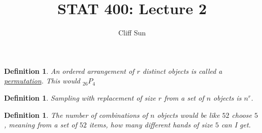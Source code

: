 \documentclass{article}
\title{STAT 400: Lecture 2}
\author{Cliff Sun}
\newtheorem{definition}[theorem]{Definition}
\newtheorem{one minute paper}[theorem]{One Minute Paper}
\begin{document}
\maketitle

\begin{definition}
    An ordered arrangement of $r$ distinct objects is called a \underline{permutation}. This would $_{26} P_4$
\end{definition}

\begin{definition}
    Sampling with replacement of size $r$ from a set of $n$ objects is $n^{r}$. 
\end{definition}

\begin{definition}
    The number of combinations of $n$ objects would be like $52$ choose $5$, meaning from a set of $52$ items, how many different hands of size $5$ can I get. 
\end{definition}
\end{document}
